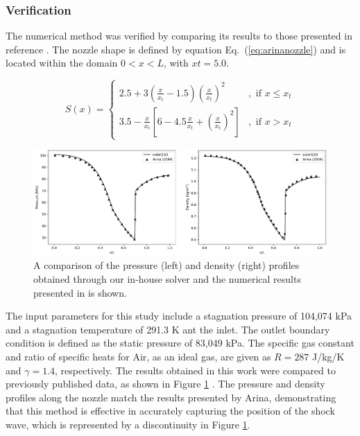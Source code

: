 \documentclass[10pt,fleqn,a4paper,twoside]{article}
\begin{document}
\subsubsection{Verification}

The numerical method was verified by comparing its results to those presented in reference \citep{ARINA2004409}. The nozzle shape is defined by equation Eq.~(\ref{eq:arinanozzle}) and is located within the domain $0 < x < L$, with $xt = 5.0$.

\begin{equation}
S(x)= \begin{cases}2.5+3\left(\frac{x}{x_t}-1.5\right)\left(\frac{x}{x_t}\right)^2 & , \text { if } x \leqslant x_t \\ 3.5-\frac{x}{x_t}\left[6-4.5 \frac{x}{x_t}+\left(\frac{x}{x_t}\right)^2\right] & , \text { if } x>x_t\end{cases}
\label{eq:arinanozzle}
\end{equation}

\begin{figure}[!ht]
	\begin{center}
		\includegraphics[width=\textwidth]{images/arina_validation.png}
		\caption{A comparison of the pressure (left) and density (right) profiles obtained through our in-house solver and the numerical results presented in \cite{ARINA2004409} is shown.}
        \label{fig:arina}
	\end{center}
\end{figure}

The input parameters for this study include a stagnation pressure of 104,074 kPa and a stagnation temperature of 291.3 K ant the inlet. The outlet boundary condition is defined as the static pressure of 83,049 kPa. The specific gas constant and ratio of specific heats for Air, as an ideal gas, are given as $R = 287$ J/kg/K and $\gamma = 1.4$, respectively. The results obtained in this work were compared to previously published data, as shown in Figure \ref{fig:arina} . The pressure and density profiles along the nozzle match the results presented by Arina, demonstrating that this method is effective in accurately capturing the position of the shock wave, which is represented by a discontinuity in Figure \ref{fig:arina}.
\end{document}
